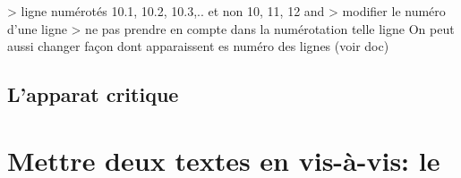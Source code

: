   > ligne numérotés 10.1, 10.2, 10.3,.. et non 10, 11, 12 
 and  > modifier le numéro d'une ligne 
 > ne pas prendre en compte dans la numérotation telle ligne
On peut aussi changer façon dont apparaissent es numéro des lignes (voir doc)


\subsection{L'apparat critique}



\section{Mettre deux textes en vis-à-vis: le }
